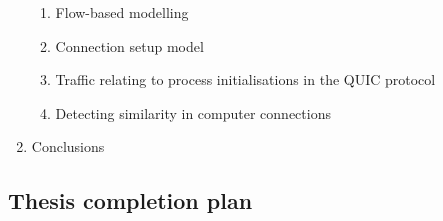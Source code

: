 \documentclass[a4paper,12pt,twoside]{article}
\begin{document}
\begin{enumerate}
\begin{enumerate}

\item Flow-based modelling

\item Connection setup model

\item Traffic relating to process initialisations in the QUIC protocol

\item Detecting similarity in computer connections


\end{enumerate}

\item Conclusions

\end{enumerate}

\subsection{Thesis completion plan}
\end{document}
